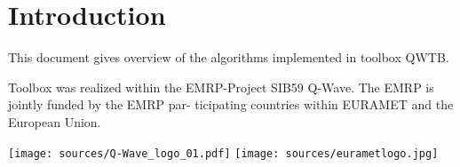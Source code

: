 \documentclass[12pt,a4paper,oneside]{report} %
\begin{document}
\chapter{Introduction} %
This document gives overview of the algorithms implemented in toolbox QWTB.

Toolbox was realized within the EMRP-Project SIB59 Q-Wave. The EMRP is jointly funded by the EMRP
par- ticipating countries within EURAMET and the European Union.

\vspace{4em}
\texttt{[image: sources/Q-Wave\_logo\_01.pdf]}
\hfill
\texttt{[image: sources/eurametlogo.jpg]}

% 
% 
% 
% 
% 
% 
\end{document}

